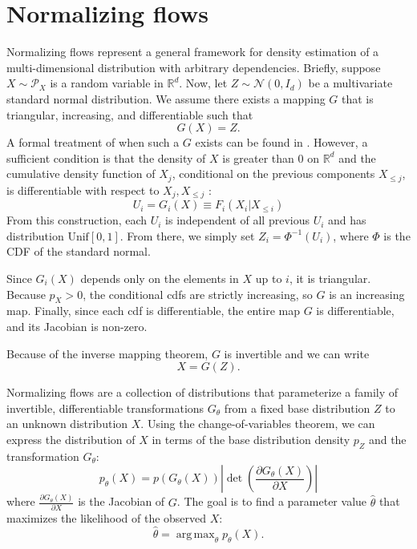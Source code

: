\documentclass{article}
\DeclareMathOperator*{\argmax}{arg\,max}
\begin{document}
\section{Normalizing flows} \label{sec:flows}
Normalizing flows \citep{papamakariosNormalizingFlowsProbabilistic2019a} represent a general framework for density estimation of a multi-dimensional distribution with arbitrary dependencies.
Briefly, suppose $X \sim \mathcal P_{X}$ is a random variable in $\mathbb R^{d}$.
Now, let $Z \sim \mathcal N(0, I_{d})$ be a multivariate standard normal distribution.
We assume there exists a mapping $G$ that is triangular, increasing, and differentiable such that
\[
  G(X) = Z.
\]
A formal treatment of when such a $G$ exists can be found in \citet{bogachevTriangularTransformationsMeasures2005}.
However, a sufficient condition is that the density of $X$ is greater than $0$ on $\mathbb R^{d}$ and the cumulative density function of $X_{j}$, conditional on the previous components $X_{\le j}$,  is differentiable with respect to $X_{j}, X_{\le j}$ \citep{papamakariosNormalizingFlowsProbabilistic2019a}:
\begin{equation*}
  U_{i} = G_{i}(X) \equiv F_{i}(X_{i}| X_{\le i})
\end{equation*}
From this construction, each $U_{i}$ is independent of all previous $U_{i}$ and has distribution $\mathrm{Unif}[0, 1]$.
From there, we simply set $Z_{i} = \Phi^{-1}(U_{i})$, where $\Phi$ is the CDF of the standard normal.

Since $G_{i}(X)$ depends only on the elements in $X$ up to $i$, it is triangular.
Because $p_{X} > 0$, the conditional cdfs are strictly increasing, so $G$ is an increasing map.
Finally, since each cdf is differentiable, the entire map $G$ is differentiable, and its Jacobian is non-zero.

Because of the inverse mapping theorem, $G$ is invertible and we can write
\[
  X = G(Z).
\]

Normalizing flows are a collection of distributions that parameterize a family of invertible, differentiable transformations $G_{\theta}$ from a fixed base distribution $Z$ to an unknown distribution $X$.
Using the change-of-variables theorem, we can express the distribution of $X$ in terms of the base distribution density $p_{Z}$ and the transformation $G_{\theta}$:
\[
 p_{\theta}(X) = p(G_{\theta}(X)) \left | \det \left( \frac{\partial G_{\theta}(X)}{\partial X} \right ) \right |
\]
where $\frac{\partial G_{\theta}(X)}{\partial X}$ is the Jacobian of $G$.
The goal is to find a parameter value $\hat \theta$ that maximizes the likelihood of the observed $X$:
\[
 \hat \theta = \argmax_{\theta} p_{\theta}(X).
\]
\end{document}
